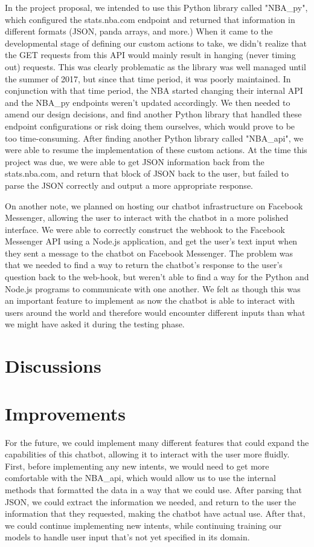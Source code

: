 \documentclass[conference]{IEEEtran}
\begin{document}
In the project proposal, we intended to use this Python library called "NBA\_py", which configured the stats.nba.com endpoint and returned that information in different formats (JSON, panda arrays, and more.) When it came to the developmental stage of defining our custom actions to take, we didn't realize that the GET requests from this API would mainly result in hanging (never timing out) requests. This was clearly problematic as the library was well managed until the summer of 2017, but since that time period, it was poorly maintained. In conjunction with that time period, the NBA started changing their internal API and the NBA\_py endpoints weren't updated accordingly. We then needed to amend our design decisions, and find another Python library that handled these endpoint configurations or risk doing them ourselves, which would prove to be too time-consuming. After finding another Python library called "NBA\_api", we were able to resume the implementation of these custom actions. At the time this project was due, we were able to get JSON information back from the stats.nba.com, and return that block of JSON back to the user, but failed to parse the JSON correctly and output a more appropriate response.

On another note, we planned on hosting our chatbot infrastructure on Facebook Messenger, allowing the user to interact with the chatbot in a more polished interface. We were able to correctly construct the webhook to the Facebook Messenger API using a Node.js application, and get the user's text input when they sent a message to the chatbot on Facebook Messenger. The problem was that we needed to find a way to return the chatbot's response to the user's question back to the web-hook, but weren't able to find a way for the Python and Node.js programs to communicate with one another. We felt as though this was an important feature to implement as now the chatbot is able to interact with users around the world and therefore would encounter different inputs than what we might have asked it during the testing phase.

\section*{Discussions}

\section*{Improvements}
For the future, we could implement many different features that could expand the capabilities of this chatbot, allowing it to interact with the user more fluidly. First, before implementing any new intents, we would need to get more comfortable with the NBA\_api, which would allow us to use the internal methods that formatted the data in a way that we could use. After parsing that JSON, we could extract the information we needed, and return to the user the information that they requested, making the chatbot have actual use. After that, we could continue implementing new intents, while continuing training our models to handle user input that's not yet specified in its domain.
\end{document}
